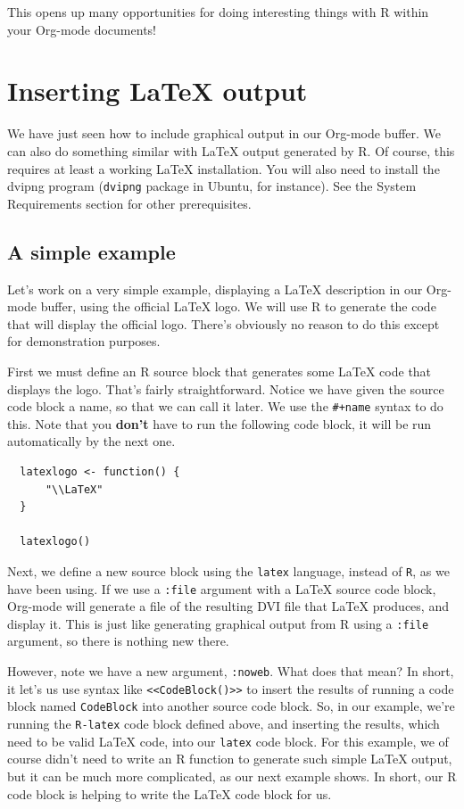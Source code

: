 \documentclass[11pt]{article}
\begin{document}
This opens up many opportunities for doing interesting things with R within your Org-mode documents!
\section*{Inserting \LaTeX{} output}
\label{sec-6}

We have just seen how to include graphical output in our Org-mode buffer. We can also do something similar with \LaTeX{} output generated by R. Of course, this requires at least a working \LaTeX{} installation. You will also need to install the dvipng program (\texttt{dvipng} package in Ubuntu, for instance). See the System Requirements section for other prerequisites.

\subsection*{A simple example}
\label{sec-6-1}

Let's work on a very simple example, displaying a \LaTeX{} description in our Org-mode buffer, using the official \LaTeX{} logo. We will use R to generate the code that will display the official logo. There's obviously no reason to do this except for demonstration purposes. 

First we must define an R source block that generates some \LaTeX{} code that displays the logo. That's fairly straightforward. Notice we have given the source code block a name, so that we can call it later. We use the \texttt{\#+name} syntax to do this. Note that you \textbf{don't} have to run the following code block, it will be run automatically by the next one.

\label{R-latex}
\begin{verbatim}
  latexlogo <- function() {
      "\\LaTeX"
  }
  
  latexlogo()
\end{verbatim}

Next, we define a new source block using the \texttt{latex} language, instead of \texttt{R}, as we have been using. If we use a \texttt{:file} argument with a \LaTeX{} source code block, Org-mode will generate a file of the resulting DVI file that \LaTeX{} produces, and display it. This is just like generating graphical output from R using a \texttt{:file} argument, so there is nothing new there.

However, note we have a new argument, \texttt{:noweb}. What does that mean? In short, it let's us use syntax like \texttt{<<CodeBlock()>>} to insert the results of running a code block named \texttt{CodeBlock} into another source code block. So, in our example, we're running the \texttt{R-latex} code block defined above, and inserting the results, which need to be valid \LaTeX{} code, into our \texttt{latex} code block. For this example, we of course didn't need to write an R function to generate such simple \LaTeX{} output, but it can be much more complicated, as our next example shows. In short, our R code block is helping to write the \LaTeX{} code block for us.
\end{document}
